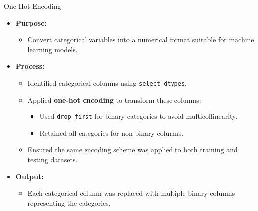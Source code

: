 \documentclass{beamer}
\begin{document}
\begin{frame}{One-Hot Encoding}
    \begin{itemize}
        \item \textbf{Purpose:}
        \begin{itemize}
            \item Convert categorical variables into a numerical format suitable for machine learning models.
        \end{itemize}
        \item \textbf{Process:}
        \begin{itemize}
            \item Identified categorical columns using \texttt{select\_dtypes}.
            \item Applied \textbf{one-hot encoding} to transform these columns:
            \begin{itemize}
                \item Used \texttt{drop\_first} for binary categories to avoid multicollinearity.
                \item Retained all categories for non-binary columns.
            \end{itemize}
            \item Ensured the same encoding scheme was applied to both training and testing datasets.
        \end{itemize}
        \item \textbf{Output:}
        \begin{itemize}
            \item Each categorical column was replaced with multiple binary columns representing the categories.
        \end{itemize}
    \end{itemize}
\end{frame}
\end{document}
